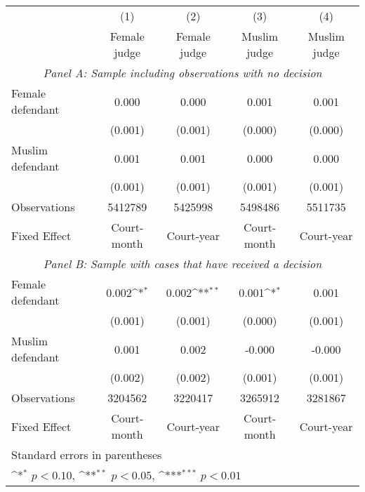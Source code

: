 {
\def\sym#1{\ifmmode^{#1}\else\(^{#1}\)\fi}
\begin{tabular}{l*{4}{c}}
\hline\hline
&\multicolumn{1}{c}{(1)}&\multicolumn{1}{c}{(2)}&\multicolumn{1}{c}{(3)}&\multicolumn{1}{c}{(4)}\\
&\multicolumn{1}{c}{Female judge}&\multicolumn{1}{c}{Female judge}&\multicolumn{1}{c}{Muslim judge}&\multicolumn{1}{c}{Muslim judge}\\
\hline \multicolumn{5}{c}{ \linebreak \textit{Panel A: Sample including observations with no decision}} \\ \hline
Female defendant    &       0.000         &       0.000         &       0.001         &       0.001         \\
&     (0.001)         &     (0.001)         &     (0.000)         &     (0.000)         \\
[1em]
Muslim defendant    &       0.001         &       0.001         &       0.000         &       0.000         \\
&     (0.001)         &     (0.001)         &     (0.001)         &     (0.001)         \\
\hline
Observations        &     5412789         &     5425998         &     5498486         &     5511735         \\
Fixed Effect        & Court-month         &  Court-year         & Court-month         &  Court-year         \\
\hline
\multicolumn{5}{c}{\linebreak \textit{Panel B: Sample with cases that have received a decision}} \\ \hline
Female defendant    &       0.002\sym{*}  &       0.002\sym{**} &       0.001\sym{*}  &       0.001         \\
&     (0.001)         &     (0.001)         &     (0.000)         &     (0.001)         \\
[1em]
Muslim defendant    &       0.001         &       0.002         &      -0.000         &      -0.000         \\
&     (0.002)         &     (0.002)         &     (0.001)         &     (0.001)         \\
\hline
Observations        &     3204562         &     3220417         &     3265912         &     3281867         \\
Fixed Effect        & Court-month         &  Court-year         & Court-month         &  Court-year         \\
\hline\hline
\multicolumn{5}{l}{\footnotesize Standard errors in parentheses}\\
\multicolumn{5}{l}{\footnotesize \sym{*} \(p<0.10\), \sym{**} \(p<0.05\), \sym{***} \(p<0.01\)}\\
\end{tabular}
}
